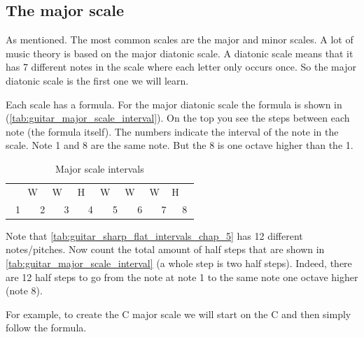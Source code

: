 \newpage

\subsection{The major scale}

As mentioned. The most common scales are the major and minor scales. A lot of music theory is based on the major diatonic scale. A diatonic scale means that it has 7 different notes in the scale where each letter only occurs once. So the major diatonic scale is the first one we will learn.

Each scale has a formula. For the major diatonic scale the formula is shown in (\autoref{tab:guitar_major_scale_interval}). On the top you see the steps between each note (the formula itself). The numbers indicate the interval of the note in the scale. Note 1 and 8 are the same note. But the 8 is one octave higher than the 1.

\begin{table}[h]
	\centering
	\begin{tabular}{*{16}{c}}
		& \multicolumn{2}{P{4mm}}{\large{W}} & \multicolumn{2}{P{4mm}}{\large{W}} & \multicolumn{2}{P{4mm}}{\large{H}} & \multicolumn{2}{P{4mm}}{\large{W}} & \multicolumn{2}{P{4mm}}{\large{W}} & \multicolumn{2}{P{4mm}}{\large{W}} & \multicolumn{2}{P{4mm}}{\large{H}} & \\
		\multicolumn{2}{P{4mm}}{1} & \multicolumn{2}{P{4mm}}{2} & \multicolumn{2}{P{4mm}}{3} & \multicolumn{2}{P{4mm}}{4} & \multicolumn{2}{P{4mm}}{5} & \multicolumn{2}{P{4mm}}{6} & \multicolumn{2}{P{4mm}}{7} & \multicolumn{2}{P{4mm}}{8}
	\end{tabular}
	\caption{Major scale intervals}
	\label{tab:guitar_major_scale_interval}
\end{table}

Note that \autoref{tab:guitar_sharp_flat_intervals_chap_5} has 12 different notes/pitches. Now count the total amount of half steps that are shown in \autoref{tab:guitar_major_scale_interval} (a whole step is two half steps). Indeed, there are 12 half steps to go from the note at note 1 to the same note one octave higher (note 8).

For example, to create the C major scale we will start on the C and then simply follow the formula.


